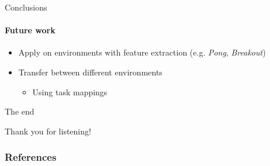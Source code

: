 \begin{frame}[fragile]{Conclusions}
\framesubtitle{Future work}
\begin{itemize}
    \item Apply on environments with feature extraction (e.g. \textit{Pong}, \textit{Breakout})
    \item Transfer between different environments
    \begin{itemize}
        \item Using task mappings
    \end{itemize}
\end{itemize}
\end{frame}

\begin{frame}[c]{The end}
\begin{center}
    \color{vubbleu} \LARGE\vubfont Thank you for listening!
\end{center}
\end{frame}

\begin{frame}[allowframebreaks]
\frametitle{References}
\footnotesize{


}
\end{frame}



